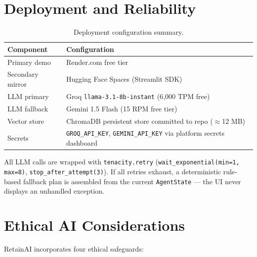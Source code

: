 \documentclass[11pt]{article}
\begin{document}
\section{Deployment and Reliability}
\label{sec:deployment}

\begin{table}[H]
\centering
\caption{Deployment configuration summary.}
\label{tab:deploy}
\renewcommand{\arraystretch}{1.5}
\begin{tabular}{L{4cm} L{9.5cm}}
\toprule
{}
\textbf{Component} & \textbf{Configuration} \\
\midrule
Primary demo      & Render.com free tier \\
Secondary mirror  & Hugging Face Spaces (Streamlit SDK) \\
LLM primary       & Groq \texttt{llama-3.1-8b-instant} (6{,}000 TPM free) \\
LLM fallback      & Gemini 1.5 Flash (15 RPM free tier) \\
Vector store      & ChromaDB persistent store committed to repo ($\approx$12 MB) \\
Secrets           & \texttt{GROQ\_API\_KEY}, \texttt{GEMINI\_API\_KEY}
                    via platform secrets dashboard \\
\bottomrule
\end{tabular}
\end{table}

All LLM calls are wrapped with \texttt{tenacity.retry}
(\texttt{wait\_exponential(min=1, max=8)}, \texttt{stop\_after\_attempt(3)}).
If all retries exhaust, a deterministic rule-based fallback plan is assembled
from the current \texttt{AgentState} --- the UI never displays an unhandled
exception.

\section{Ethical AI Considerations}
\label{sec:ethics}

RetainAI incorporates four ethical safeguards:
\end{document}
